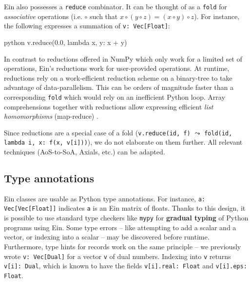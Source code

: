 Ein also possesses a \texttt{reduce} combinator. 
It can be thought of as a \texttt{fold} for \textit{associative} operations (i.e. $\circ$ such that $x \circ (y \circ z) = (x \circ y) \circ z$). 
For instance, the following expresses a summation of \texttt{v: Vec[Float]}:
\begin{center}
\begin{cminted}{python}
v.reduce(0.0, lambda x, y: x + y)
\end{cminted}
\end{center}
In contrast to reductions offered in NumPy which only work for a limited set of operations, Ein's reductions work for user-provided operations.
At runtime, reductions rely on a work-efficient reduction scheme on a binary-tree to take advantage of data-parallelism. This can be orders of magnitude faster than a corresponding \texttt{fold} which would rely on an inefficient Python loop. Array comprehensions together with reductions allow expressing efficient \textit{list homomorphisms} (map-reduce) \cite{cole1993parallel}. 

Since reductions are a special case of a fold (\texttt{v.reduce(id, f)} $\leadsto$ \texttt{fold(id, lambda i, x: f(x, v[i]))}), we do not elaborate on them further. All relevant techniques (AoS-to-SoA, Axials, etc.) can be adapted.


\subsection{Type annotations}
\label{type-annotations}

Ein classes are usable as Python type annotations. 
For instance, \texttt{a: Vec[Vec[Float]]} indicates \texttt{a} is an Ein matrix of floats. Thanks to this design, it is possible to use standard type checkers like \texttt{mypy} for \textbf{gradual typing} of Python programs using Ein. Some type errors -- like attempting to add a scalar and a vector, or indexing into a scalar -- may be discovered before runtime. Furthermore, type hints for records work on the same principle -- we previously wrote \texttt{v: Vec[Dual]} for a vector \texttt{v} of dual numbers. Indexing into \texttt{v} returns \texttt{v[i]: Dual}, which is known to have the fields \texttt{v[i].real: Float} and \texttt{v[i].eps: Float}.


